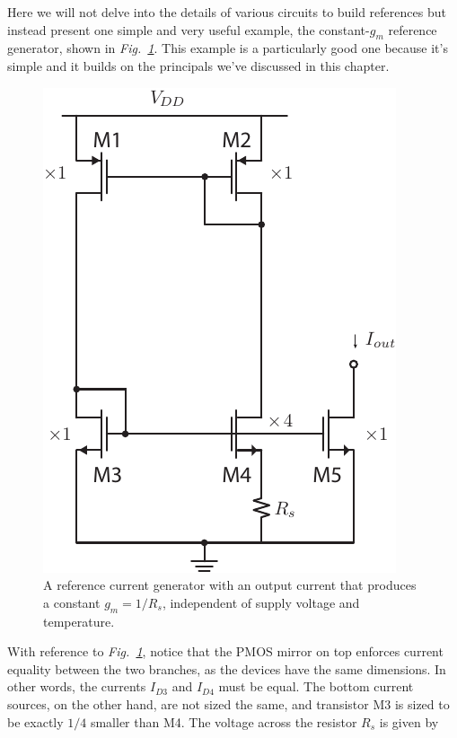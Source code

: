 Here we will not delve into the details of various circuits to build references but instead present one simple and very useful example, the constant-$g_m$ reference generator, shown in \emph{Fig.~\ref{fig:constant_gm_ref}}.  This example is a particularly good one because it's simple and it builds on the principals we've discussed in this chapter.
\begin{figure}[tb]
\centering
\includegraphics[scale=1]{constant_gm_bias.pdf}
\caption{A reference current generator with an output current that produces a constant $g_m = 1/R_s$, independent of supply voltage and temperature.}
\label{fig:constant_gm_ref}
\end{figure}
With reference to \emph{Fig.~\ref{fig:constant_gm_ref}}, notice that the PMOS mirror on top enforces current equality between the two branches, as the devices have the same dimensions.  In other words, the currents $I_{D3}$ and $I_{D4}$ must be equal.  The bottom current sources, on the other hand, are not sized the same, and transistor M3 is sized to be exactly $1/4$ smaller than M4.  The voltage across the resistor $R_s$ is given by
